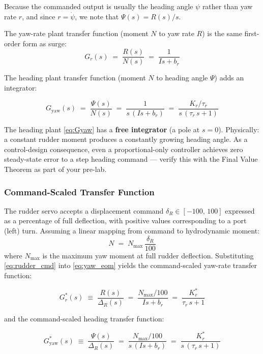 \documentclass[../../book.tex]{subfiles}
\begin{document}
Because the commanded output is usually the heading angle $\psi$ rather
than yaw rate $r$, and since $r = \dot\psi$, we note that
$\Psi(s) = R(s)/s$.

The yaw-rate plant transfer function (moment $N$ to yaw rate $R$) is the
same first-order form as surge:
\[
  G_r(s) \;=\; \frac{R(s)}{N(s)} \;=\; \frac{1}{Is + b_r}
\]

The heading plant transfer function (moment $N$ to heading angle $\Psi$)
adds an integrator:

\begin{equation}
  G_{\mathrm{yaw}}(s)
  \;=\; \frac{\Psi(s)}{N(s)}
  \;=\; \frac{1}{s\,(Is + b_r)}
  \;=\; \frac{K_r/\tau_r}{s\,(\tau_r\,s + 1)}
  \label{eq:Gyaw}
\end{equation}

  The heading plant \eqref{eq:Gyaw} has a \textbf{free integrator} (a pole
  at $s = 0$).  Physically: a constant rudder moment produces a constantly
  growing heading angle.  As a control-design consequence, even a
  proportional-only controller achieves zero steady-state error to a step
  heading command --- verify this with the Final Value Theorem as part of
  your pre-lab.

\subsubsection{Command-Scaled Transfer Function}

The rudder servo accepts a displacement command $\delta_R \in [-100,\,100]$
expressed as a percentage of full deflection, with positive values
corresponding to a port (left) turn.  Assuming a linear mapping from
command to hydrodynamic moment:
\begin{equation}
  N \;=\; N_{\max}\,\frac{\delta_R}{100}
  \label{eq:rudder_cmd}
\end{equation}
where $N_{\max}$ is the maximum yaw moment at full rudder deflection.
Substituting \eqref{eq:rudder_cmd} into \eqref{eq:yaw_eom} yields the
command-scaled yaw-rate transfer function:

\begin{equation}
  G_r^*(s)
  \;\equiv\; \frac{R(s)}{\Delta_R(s)}
  \;=\; \frac{N_{\max}/100}{Is + b_r}
  \;=\; \frac{K_r^*}{\tau_r\,s + 1}
  \label{eq:Gr_cmd}
\end{equation}

and the command-scaled heading transfer function:

\begin{equation}
  G_{\mathrm{yaw}}^*(s)
  \;\equiv\; \frac{\Psi(s)}{\Delta_R(s)}
  \;=\; \frac{N_{\max}/100}{s\,(Is + b_r)}
  \;=\; \frac{K_r^*}{s\,(\tau_r\,s + 1)}
  \label{eq:Gyaw_cmd}
\end{equation}
\end{document}
